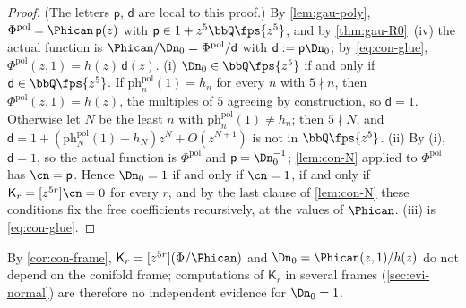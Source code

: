 \begin{proof}
(The letters $\mathsf p$, $\mathsf d$ are local to this proof.) By \cref{lem:gau-poly}, $\Phi^{\mathrm{pol}}=\Phican\,\mathsf p(z)$ with $\mathsf p\in1+z^5\bbQ\fps{z^5}$, and by \cref{thm:gau-R0}~(iv) the actual function is $\Phican/\Dn_0=\Phi^{\mathrm{pol}}/\mathsf d$ with $\mathsf d:=\mathsf p\Dn_0$; by \eqref{eq:con-glue}, $\Phi^{\mathrm{pol}}(z,1)=h(z)\,\mathsf d(z)$. (i) $\Dn_0\in\bbQ\fps{z^5}$ if and only if $\mathsf d\in\bbQ\fps{z^5}$. If $\mathrm{ph}^{\mathrm{pol}}_n(1)=h_n$ for every $n$ with $5\nmid n$, then $\Phi^{\mathrm{pol}}(z,1)=h(z)$, the multiples of $5$ agreeing by construction, so $\mathsf d=1$. Otherwise let $N$ be the least $n$ with $\mathrm{ph}^{\mathrm{pol}}_n(1)\neq h_n$; then $5\nmid N$, and $\mathsf d=1+(\mathrm{ph}^{\mathrm{pol}}_N(1)-h_N)z^N+O(z^{N+1})$ is not in $\bbQ\fps{z^5}$. (ii) By (i), $\mathsf d=1$, so the actual function is $\Phi^{\mathrm{pol}}$ and $\mathsf p=\Dn_0^{-1}$; \cref{lem:con-N} applied to $\Phi^{\mathrm{pol}}$ has $\cn=\mathsf p$. Hence $\Dn_0=1$ if and only if $\cn=1$, if and only if $\mathsf K_r=[z^{5r}]\cn=0$ for every $r$, and by the last clause of \cref{lem:con-N} these conditions fix the free coefficients recursively, at the values of $\Phican$. (iii) is \eqref{eq:con-glue}.
\end{proof}

By \cref{cor:con-frame}, $\mathsf K_r=[z^{5r}](\Phi/\Phican)$ and $\Dn_0=\Phican(z,1)/h(z)$ do not depend on the conifold frame; computations of $\mathsf K_r$ in several frames (\cref{sec:evi-normal}) are therefore no independent evidence for $\Dn_0=1$.

